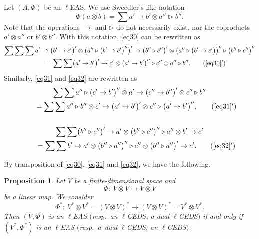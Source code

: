 \documentclass[pdftex]{sigma}
\numberwithin{equation}{section}
\newtheorem{Proposition}[Theorem]{Proposition}
 { \theoremstyle{definition}
\newtheorem{Definition}[Theorem]{Definition}
\newtheorem{Note}[Theorem]{Note}
\newtheorem{Example}[Theorem]{Example}
\newtheorem{Remark}[Theorem]{Remark}
\newtheorem{Notation}[Theorem]{Notation}}
\begin{document}
\begin{Notation}
Let $(A,\Phi)$ be an $\ell$EAS. We use Sweedler's-like notation
\[
\Phi(a\otimes b)=\sum a'\rightarrow b' \otimes a''\triangleright b''.
\]
Note that the operations $\rightarrow$ and $\triangleright$ do not necessarily exist, nor the coproducts $a'\otimes a''$ or $b'\otimes b''$.
With this notation, \eqref{eq30} can be rewritten as
\begin{gather}
\sum\sum\sum a' \rightarrow \bigl(b' \rightarrow c'\bigr)'\otimes \bigl(a'' \triangleright \bigl(b' \rightarrow c'\bigr)''\bigr)'\rightarrow \bigl(b'' \triangleright c''\bigr)' \otimes \bigl(a'' \triangleright \bigl(b' \rightarrow c'\bigr)\bigr)''\triangleright \bigl(b'' \triangleright c''\bigr)''\nonumber\\
 \qquad=\sum\sum \bigl(a' \rightarrow b'\bigr)'\rightarrow c' \otimes \bigl(a' \rightarrow b'\bigr)''\triangleright c'' \otimes a'' \triangleright b''.\tag{\ref{eq30}$'$}
\end{gather}
Similarly, \eqref{eq31} and \eqref{eq32} are rewritten as
\begin{gather}
 \sum\sum a'' \triangleright \bigl(c' \rightarrow b'\bigr)'' \otimes a' \rightarrow \bigl(c'' \rightarrow b''\bigr)'\otimes c'' \triangleright b''\nonumber\\
\qquad=\sum\sum a'' \triangleright b'' \otimes c' \rightarrow \bigl(a' \rightarrow b'\bigr)'\otimes c'' \triangleright \bigl(a' \rightarrow b'\bigr)'',\tag{\ref{eq31}$'$}\\
\nonumber\\
 \sum\sum \bigl(b'' \triangleright c''\bigr)'\rightarrow a'\otimes \bigl(b'' \triangleright c''\bigr)''\triangleright a''\otimes b' \rightarrow c'\nonumber\\
\qquad=\sum\sum b' \rightarrow a' \otimes \bigl(b'' \triangleright a''\bigr)''\triangleright c''\otimes \bigl(b'' \triangleright a''\bigr)'\rightarrow c'.\tag{\ref{eq32}$'$}
\end{gather}\end{Notation}

By transposition of \eqref{eq30}, \eqref{eq31} and \eqref{eq32}, we have the following.

\begin{Proposition}\label{prop4.2}
Let $V$ be a finite-dimensional space and
\[
\Phi\colon \ V\otimes V\longrightarrow V\otimes V
\]
 be a linear map. We consider
\[
\Phi^*\colon \ V^*\otimes V^*=(V\otimes V)^*\longrightarrow(V\otimes V)^*=V^*\otimes V^*.
\]
Then $(V,\Phi)$ is an $\ell$EAS $($resp.\ an $\ell$CEDS, a dual $\ell$CEDS$)$ if and only if $(V^*,\Phi^*)$ is an $\ell$EAS $($resp.\ a~dual $\ell$CEDS, an $\ell$CEDS$)$.
\end{Proposition}
\end{document}
